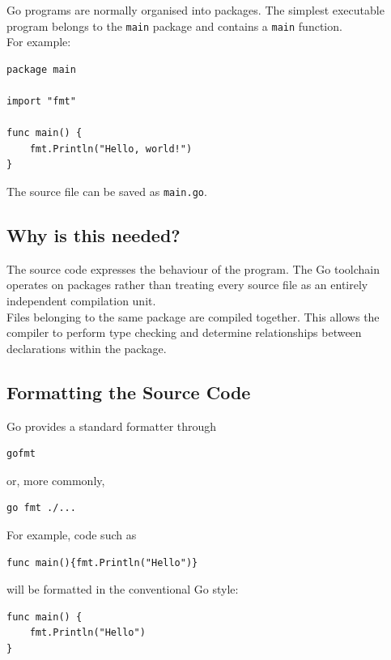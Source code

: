 Go programs are normally organised into packages.  The simplest
executable program belongs to the \texttt{main} package and contains a
\texttt{main} function.\\

For example:

\begin{lstlisting}
package main

import "fmt"

func main() {
    fmt.Println("Hello, world!")
}
\end{lstlisting}

The source file can be saved as \texttt{main.go}.

\subsection*{Why is this needed?}

The source code expresses the behaviour of the program.  The Go
toolchain operates on packages rather than treating every source file
as an entirely independent compilation unit.\\

Files belonging to the same package are compiled together.  This allows
the compiler to perform type checking and determine relationships
between declarations within the package.

\subsection{Formatting the Source Code}

Go provides a standard formatter through

\begin{lstlisting}
gofmt
\end{lstlisting}

or, more commonly,

\begin{lstlisting}
go fmt ./...
\end{lstlisting}

For example, code such as

\begin{lstlisting}
func main(){fmt.Println("Hello")}
\end{lstlisting}

will be formatted in the conventional Go style:

\begin{lstlisting}
func main() {
    fmt.Println("Hello")
}
\end{lstlisting}


